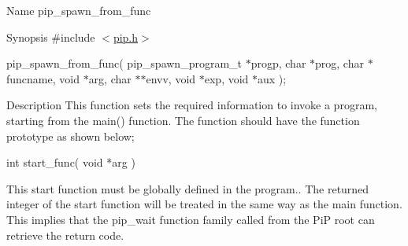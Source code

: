 \begin{DoxyParagraph}{Name}
pip\-\_\-spawn\-\_\-from\-\_\-func
\end{DoxyParagraph}
\begin{DoxyParagraph}{Synopsis}
\#include $<$\hyperlink{pip_8h_source}{pip.\-h}$>$ \par
pip\-\_\-spawn\-\_\-from\-\_\-func( pip\-\_\-spawn\-\_\-program\-\_\-t $\ast$progp, char $\ast$prog, char $\ast$funcname, void $\ast$arg, char $\ast$$\ast$envv, void $\ast$exp, void $\ast$aux );
\end{DoxyParagraph}
\begin{DoxyParagraph}{Description}
This function sets the required information to invoke a program, starting from the {\ttfamily main()} function. The function should have the function prototype as shown below; 
\begin{DoxyCode}
\textcolor{keywordtype}{int} start\_func( \textcolor{keywordtype}{void} *arg )
\end{DoxyCode}
 This start function must be globally defined in the program.. The returned integer of the start function will be treated in the same way as the {\ttfamily main} function. This implies that the {\ttfamily pip\-\_\-wait} function family called from the Pi\-P root can retrieve the return code.
\end{DoxyParagraph}

